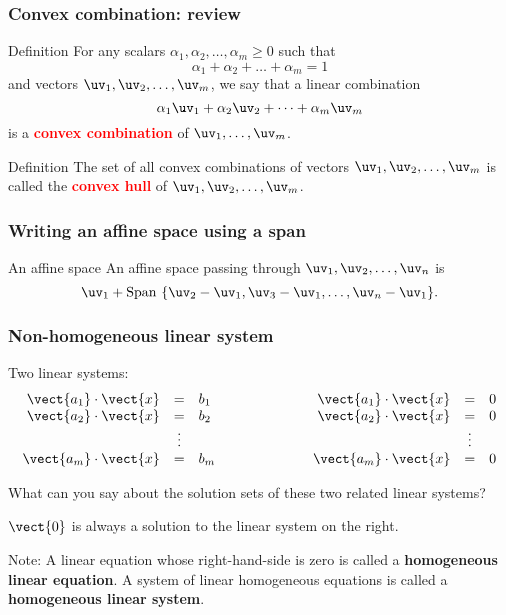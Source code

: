 \begin{frame}
  \frametitle{Convex combination: review}
  
  \begin{block}{Definition}
    For any scalars $\alpha_1,\alpha_2,\ldots,\alpha_m \geq 0$
    such that 
    \[
    \alpha_1 + \alpha_2 + \ldots + \alpha_m = 1
    \]
    and vectors $\uv_1,\uv_2,\ldots,\uv_m$, we say that a linear combination
    \[
    \alpha_1\uv_1 + \alpha_2\uv_2 + \cdots + \alpha_m \uv_m
    \]
    is a \textcolor{red}{\bf convex combination} of $\uv_1,\ldots,\uv_m$.
  \end{block}

  \begin{block}{Definition}
    The set of all convex combinations of 
    vectors $\uv_1,\uv_2,\ldots,\uv_m$
    is called the \textcolor{red}{\bf convex hull} of
    $\uv_1,\uv_2,\ldots,\uv_m$.
  \end{block}

\end{frame}

\begin{frame}
  \frametitle{Writing an affine space using a span}
  \pause

  \begin{block}{An affine space}
    An affine space passing through $\uv_1,\uv_2,\ldots,\uv_n$ is
    \[
    \uv_1 + \mathrm{Span}\ \{\uv_2-\uv_1,\uv_3-\uv_1,\ldots,\uv_n-\uv_1\}.
    \]
  \end{block}
\end{frame}

\begin{frame}
  \frametitle{Non-homogeneous linear system}
  Two linear systems:
  \[
  \begin{array}{rcl}
    \vect{a_1}\cdot\vect{x} &=& b_1 \\
    \vect{a_2}\cdot\vect{x} &=& b_2 \\
    &\vdots&\\
    \vect{a_m}\cdot\vect{x} &=& b_m
  \end{array}
  \ \ \ \ \ \ \ \ \ \ \ \ \ \ \ \ \ \ 
  \begin{array}{rcl}
    \vect{a_1}\cdot\vect{x} &=& 0 \\
    \vect{a_2}\cdot\vect{x} &=& 0 \\
    &\vdots&\\
    \vect{a_m}\cdot\vect{x} &=& 0
  \end{array}
  \]

  What can you say about the solution sets of these two related linear
  systems?

  \pause

  $\vect{0}$ is always a solution to the linear system on the right.

  
  Note: A linear equation whose right-hand-side is zero is called a
  {\bf homogeneous linear equation}.  A system of linear homogeneous
  equations is called a {\bf homogeneous linear system}.
\end{frame}

